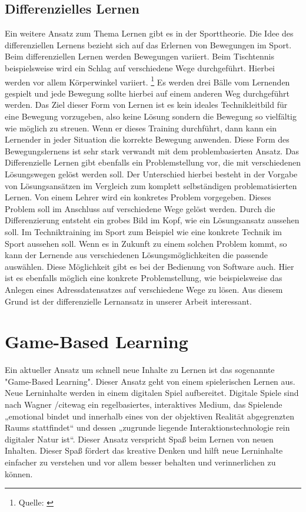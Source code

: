 \subsection{Differenzielles Lernen}
Ein weitere Ansatz zum Thema Lernen gibt es in der Sporttheorie. Die Idee des differenziellen Lernens bezieht sich auf das Erlernen von Bewegungen im Sport. Beim differenziellen Lernen werden Bewegungen variiert. Beim Tischtennis beispielsweise wird ein Schlag auf verschiedene Wege durchgeführt. Hierbei werden vor allem Körperwinkel variiert. \footnote{Quelle: \cite{differenziellesLernen}} Es werden drei Bälle vom Lernenden gespielt und jede Bewegung sollte hierbei auf einem anderen Weg durchgeführt werden. Das Ziel dieser Form von Lernen ist es kein ideales Technikleitbild für eine Bewegung vorzugeben, also keine Lösung sondern die Bewegung so vielfältig wie möglich zu streuen. Wenn er dieses Training durchführt, dann kann ein Lernender in jeder Situation die korrekte Bewegung anwenden. Diese Form des Bewegungslernens ist sehr stark verwandt mit dem problembasierten Ansatz. Das Differenzielle Lernen gibt ebenfalls ein Problemstellung vor, die mit verschiedenen Lösungswegen gelöst werden soll. Der Unterschied hierbei besteht in der Vorgabe von Lösungsansätzen im Vergleich zum komplett selbständigen problematisierten Lernen. Von einem Lehrer wird ein konkretes Problem vorgegeben. Dieses Problem soll im Anschluss auf verschiedene Wege gelöst werden. Durch die Differenzierung entsteht ein grobes Bild im Kopf, wie ein Lösungsansatz aussehen soll. Im Techniktraining im Sport zum Beispiel wie eine konkrete Technik im Sport aussehen soll. Wenn es in Zukunft zu einem solchen Problem kommt, so kann der Lernende aus verschiedenen Lösungsmöglichkeiten die passende auswählen. Diese Möglichkeit gibt es bei der Bedienung von Software auch. Hier ist es ebenfalls möglich eine konkrete Problemstellung, wie beispielsweise das Anlegen eines Adressdatensatzes auf verschiedene Wege zu lösen. Aus diesem Grund ist der differenzielle Lernansatz in unserer Arbeit interessant.


\section{Game-Based Learning}
Ein aktueller Ansatz um schnell neue Inhalte zu Lernen ist das sogenannte "Game-Based Learning". Dieser Ansatz geht von einem spielerischen Lernen aus. Neue Lerninhalte werden in einem digitalen Spiel aufbereitet. Digitale Spiele sind nach Wagner /cite{wag} ein regelbasiertes,
interaktives Medium, das Spielende „emotional bindet und innerhalb eines von der objektiven Realität abgegrenzten Raums stattfindet“ und dessen „zugrunde liegende Interaktionstechnologie rein digitaler Natur ist“. Dieser Ansatz verspricht Spaß beim Lernen von neuen Inhalten. Dieser Spaß fördert das kreative Denken und hilft neue Lerninhalte einfacher zu verstehen und vor allem besser behalten und verinnerlichen zu können. 


